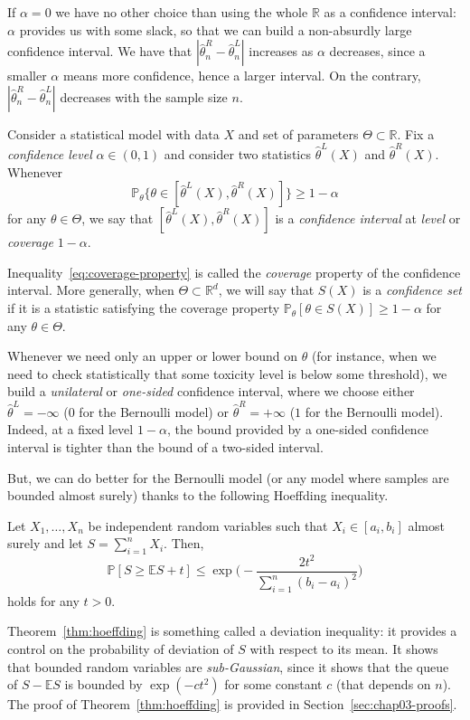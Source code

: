 \documentclass[
	fontsize=11pt, %
	twoside=false, %
	numbers=noenddot, %
]{kaobook}
\renewcommand{\P}{\mathbb P}
\newcommand{\E}{\mathbb E}
\newcommand{\R}{\mathbb R}
\newcommand{\wh}{\widehat}
\begin{document}
If $\alpha = 0$ we have no other choice than using the whole $\R$ as a confidence interval: $\alpha$  provides us with some slack, so that we can build a non-absurdly large confidence interval. 
We have that $|\wh \theta_n^R - \wh \theta_n^L|$ increases as $\alpha$ decreases, since a smaller $\alpha$ means more confidence, hence a larger interval.
On the contrary, $|\wh \theta_n^R - \wh \theta_n^L|$ decreases with the sample size $n$.
\begin{definition}
	Consider a statistical model with data $X$ and set of parameters $\Theta \subset \R$. 
	Fix a \emph{confidence level} $\alpha \in (0, 1)$ and consider two statistics $\wh \theta^L(X)$ and $\wh \theta^R(X)$. Whenever 
	\begin{equation}
		\label{eq:coverage-property}
		\P_\theta \big\{ \theta \in [\wh \theta^L(X), \wh \theta^R(X)] \big\} \geq 1 - \alpha
	\end{equation}
	for any $\theta \in \Theta$, we say that $[\wh \theta^L(X), \wh \theta^R(X)]$ is a \emph{confidence interval} at \emph{level} or \emph{coverage} $1 - \alpha$.
\end{definition}
Inequality~\eqref{eq:coverage-property} is called the \emph{coverage} property of the confidence interval.
More generally, when $\Theta \subset \R^d$, we will say that $S(X)$ is a \emph{confidence set} if it is a statistic satisfying the coverage property $\P_\theta[ \theta \in S(X) ] \geq 1 - \alpha$ for any $\theta \in \Theta$.
\begin{remark}
	Whenever we need only an upper or lower bound on $\theta$ (for instance, when we need to check statistically that some toxicity level is below some threshold), we build a \emph{unilateral} or \emph{one-sided} confidence interval, where we choose either $\wh \theta^L = -\infty$ ($0$ for the Bernoulli model) or $\wh \theta^R = +\infty$ ($1$ for the Bernoulli model).
	Indeed, at a fixed level $1 - \alpha$, the bound provided by a one-sided confidence interval is tighter than the bound of a two-sided interval. 
\end{remark}
But, we can do better for the Bernoulli model (or any model where samples are bounded almost surely) thanks to the following Hoeffding inequality.
\begin{theorem}[Hoeffding]
	\label{thm:hoeffding}
	Let $X_1, \ldots, X_n$ be independent random variables such that $X_i \in [a_i, b_i]$ almost surely and let $S = \sum_{i=1}^n X_i$. Then,
	\begin{equation*}
		\P[ S \geq \E S + t] \leq \exp\Big( - \frac{2 t^2}{\sum_{i=1}^n (b_i - a_i)^2} \Big)
	\end{equation*}
	holds for any $t >0$.
\end{theorem}
Theorem~\ref{thm:hoeffding} is something called a deviation inequality: it provides a control on the probability of deviation of $S$ with respect to its mean.
It shows that bounded random variables are \emph{sub-Gaussian}, since it shows that the queue of $S - \E S$ is bounded by $\exp(-c t^2)$ for some constant $c$ (that depends on $n$).
The proof of Theorem~\ref{thm:hoeffding} is provided in Section~\ref{sec:chap03-proofs}.
\end{document}
